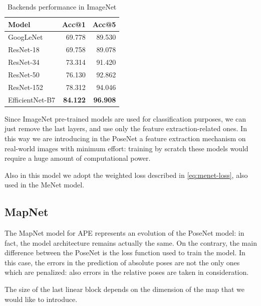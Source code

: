 \begin{table}[htbp]
    \caption{Backends performance in ImageNet}
    \begin{center}
        \begin{tabular}{lrr}
            \toprule
            Model           & Acc@1           & Acc@5           \\
            \midrule
            GoogLeNet       & 69.778          & 89.530          \\
            ResNet-18       & 69.758          & 89.078          \\
            ResNet-34       & 73.314          & 91.420          \\
            ResNet-50       & 76.130          & 92.862          \\
            ResNet-152      & 78.312          & 94.046          \\
            EfficientNet-B7 & \textbf{84.122} & \textbf{96.908} \\
            \bottomrule
        \end{tabular}
        \label{tab:backend-performance-imagenet}
    \end{center}
\end{table}

Since ImageNet pre-trained models are used for classification purposes, we can just remove the last layers, and use only the feature extraction-related ones. In this way we are introducing in the PoseNet a feature extraction mechanism on real-world images with minimum effort: training by scratch these models would require a huge amount of computational power.

Also in this model we adopt the weighted loss described in \cref{eq:menet-loss}, also used in the MeNet model.

\subsection{MapNet}
The MapNet model for APE represents an evolution of the PoseNet model: in fact, the model architecture remains actually the same. On the contrary, the main difference between the PoseNet is the loss function used to train the model. In this case, the errors in the prediction of absolute poses are not the only ones which are penalized: also errors in the relative poses are taken in consideration.

The size of the last linear block depends on the dimension of the map that we would like to introduce.

